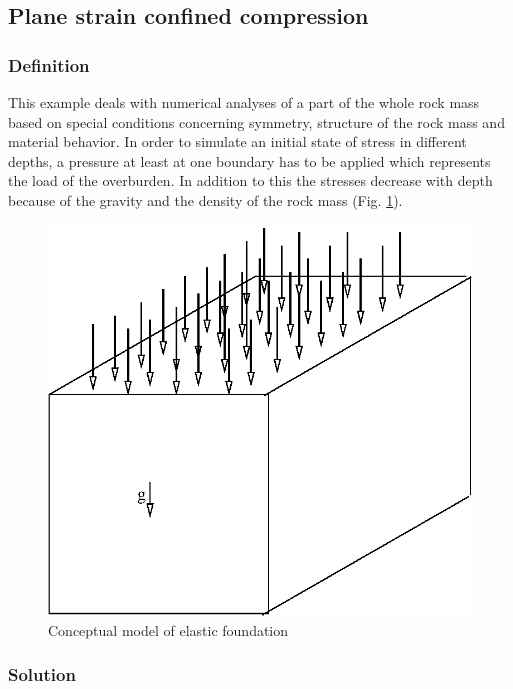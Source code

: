\subsection{Plane strain confined compression}
\label{subsec:Me1}

\subsubsection{Definition}
\label{subsubsec:Me1_def}

This example deals with numerical analyses of a part of the whole rock mass based on special conditions concerning symmetry, structure of the rock mass and material behavior. In order to simulate an initial state of stress in different depths, a pressure at least at one boundary has to be applied which represents the load of the overburden. In addition to this the stresses decrease with depth because of the gravity and the density of the rock mass (Fig. \ref{Me_fme:cfound}).
\begin{figure}[!htb]
  \begin{center}
    \includegraphics[scale=0.45]{PART_II/M/ex_plate_model.eps}
  \end{center}
  \caption{Conceptual model of elastic foundation}
  \label{Me_fme:cfound}
\end{figure}

\vspace*{-2.5ex}
\subsubsection{Solution}
\label{subsubsec:Me1_sol}

